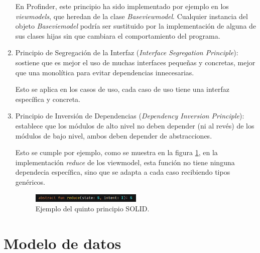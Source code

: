 \begin{enumerate}
    En Profinder, este principio ha sido implementado por ejemplo en los \textit{viewmodels}, que heredan de la clase \textit{Baseviewmodel}. Cualquier instancia del objeto \textit{Baseviemodel} podría ser sustituido por la implementación de alguna de sus clases hijas sin que cambiara el comportamiento del programa.
    \item Principio de Segregación de la Interfaz (\textit{Interface Segregation Principle}):  sostiene que es mejor el uso de muchas interfaces pequeñas y concretas, mejor que una monolítica para evitar dependencias innecesarias.
    
    Esto se aplica en los casos de uso, cada caso de uso tiene una interfaz específica y concreta.
    \item Principio de Inversión de Dependencias (\textit{Dependency Inversion Principle}): establece que los módulos de alto nivel no deben depender (ni al revés) de los módulos de bajo nivel, ambos deben depender de abstracciones.
    
    Esto se cumple por ejemplo, como se muestra en la figura \ref{fig:ejemplo_reduce}, en la implementación \textit{reduce} de los viewmodel, esta función no tiene ninguna dependecia específica, sino que se adapta a cada caso recibiendo tipos genéricos.
    \begin{figure}[h]
        \centering
        \includegraphics[width = 0.5\textwidth]{Imagenes/Fuentes/ejemplo_reduce.png}
        \caption{Ejemplo del quinto principio SOLID.}
        \label{fig:ejemplo_reduce}
    \end{figure}
\end{enumerate}

\section{Modelo de datos}

